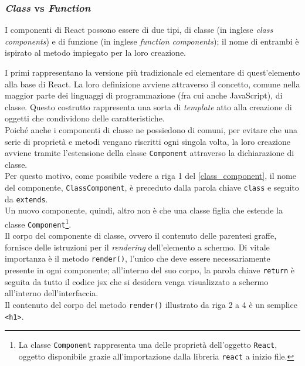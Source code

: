 \subsubsection{\textit{Class} vs \textit{Function}}
\label{subsubsec:Class vs Function}
I componenti di React possono essere di due tipi, di classe (in inglese \textit{class components}) e di funzione (in inglese \textit{function components}); il nome di entrambi è ispirato al metodo impiegato per la loro creazione.

I primi rappresentano la versione più tradizionale ed elementare di quest'elemento alla base di React. La loro definizione avviene attraverso il concetto, comune nella maggior parte dei linguaggi di programmazione (fra cui anche JavaScript), di classe. Questo costrutto rappresenta una sorta di \textit{template} atto alla creazione di oggetti che condividono delle caratteristiche.\\
Poiché anche i componenti di classe ne possiedono di comuni, per evitare che una serie di proprietà e metodi vengano riscritti ogni singola volta, la loro creazione avviene tramite l'estensione della classe \texttt{Component} attraverso la dichiarazione di classe.\\
Per questo motivo, come possibile vedere a riga 1 del \autoref{class_component}, il nome del componente, \texttt{ClassComponent}, è preceduto dalla parola chiave \texttt{class} e seguito da \texttt{extends}.\\
Un nuovo componente, quindi, altro non è che una classe figlia che estende la classe \texttt{Component}\footnote{La classe \texttt{Component} rappresenta una delle proprietà dell'oggetto \texttt{React}, oggetto disponibile grazie all'importazione dalla libreria \texttt{react} a inizio file.}.\\
Il corpo del componente di classe, ovvero il contenuto delle parentesi graffe, fornisce delle istruzioni per il \textit{rendering} dell'elemento a schermo. Di vitale importanza è il metodo \texttt{render()}, l'unico che deve essere necessariamente presente in ogni componente; all'interno del suo corpo, la parola chiave \texttt{return} è seguita da tutto il codice \acrshort{jsx} che si desidera venga visualizzato a schermo all'interno dell'interfaccia.\\
Il contenuto del corpo del metodo \texttt{render()} illustrato da riga 2 a 4 è un semplice \texttt{<h1>}.



